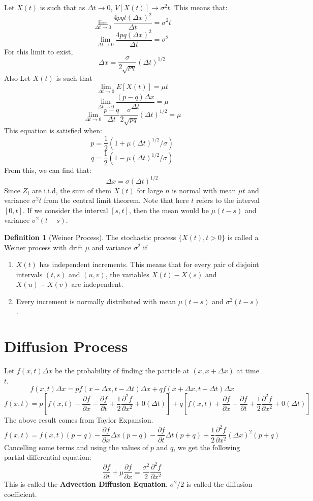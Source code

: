 \documentclass[12pt,letterpaper]{book}
\theoremstyle{definition}
\newtheorem{definition}{Definition}%
\begin{document}
Let $X(t)$ is such that as $\Delta t \rightarrow 0$, $V[X(t)] \rightarrow \sigma^2t$. This means that:
\[\lim_{\Delta t \rightarrow 0} \frac{4pqt (\Delta x)^2}{\Delta t} = \sigma^2 t\]
\[\lim_{\Delta t \rightarrow 0} \frac{4pq (\Delta x)^2}{\Delta t} = \sigma^2\]
For this limit to exist, 
\[\Delta x = \frac{\sigma}{2\sqrt{pq}} (\Delta t)^{1/2}\]
Also Let $X(t)$ is such that 
\[\lim_{\Delta t \rightarrow 0} E[X(t)] = \mu t\]
\[\lim_{\Delta t \rightarrow 0} \frac{(p-q) \Delta x}{\Delta t} = \mu\]
\[\lim_{\Delta t \rightarrow 0} \frac{p-q}{\Delta t} \frac{\sigma}{2\sqrt{pq}} (\Delta t)^{1/2} = \mu\]
This equation is satisfied when:
\[p = \frac{1}{2} (1 + \mu (\Delta t)^{1/2} / \sigma)\]
\[q = \frac{1}{2} (1 - \mu (\Delta t)^{1/2} / \sigma)\]
From this, we can find that:
\[\Delta x = \sigma (\Delta t)^{1/2}\]
Since $Z_i$ are i.i.d, the sum of them $X(t)$ for large $n$ is normal with mean $\mu t$ and variance $\sigma^2 t$ from the central limit theorem. Note that here $t$ refers to the interval $[0,t]$. If we consider the interval $[s,t]$, then the mean would be $\mu(t-s)$ and variance $\sigma^2(t-s)$.

\begin{definition}[Weiner Process]
  The stochastic process $\{X(t), t > 0\}$ is called a Weiner process with drift $\mu$ and variance $\sigma^2$ if
  \begin{enumerate}
    \item $X(t)$ has independent increments. This means that for every pair of disjoint intervals $(t,s)$ and $(u,v)$, the variables $X(t) - X(s)$ and $X(u) - X(v)$ are independent.
    \item Every increment is normally distributed with mean $\mu(t-s)$ and $\sigma^2(t-s)$.
  \end{enumerate}
\end{definition}

\section{Diffusion Process}

Let $f(x,t) \Delta x$ be the probability of finding the particle at $(x, x+ \Delta x)$ at time $t$.
\[f(x,t) \Delta x = p f(x - \Delta x, t - \Delta t) \Delta x + q f(x + \Delta x, t - \Delta t) \Delta x\]
\[f(x,t) = p \left[f(x,t) - \frac{\partial f}{\partial x} - \frac{\partial f}{\partial t} + \frac{1}{2} \frac{\partial ^ 2 f}{\partial x^2} + 0 (\Delta t) \right] + q\left[f(x,t) + \frac{\partial f}{\partial x} - \frac{\partial f}{\partial t} + \frac{1}{2} \frac{\partial ^ 2 f}{\partial x^2} + 0 (\Delta t) \right]  \]
The above result comes from Taylor Expansion.
\[f(x,t) = f(x,t)(p+q) - \frac{\partial f}{\partial x} \Delta x (p-q) - \frac{\partial f}{\partial t} \Delta t (p+q) + \frac{1}{2} \frac{\partial^2 f}{\partial x^2} (\Delta x)^2 (p+q) \]
Cancelling some terms and using the values of $p$ and $q$, we get the following partial differential equation:
\[\frac{\partial f}{\partial t} + \mu \frac{\partial f}{\partial x} = \frac{\sigma^2}{2} \frac{\partial^2 f}{\partial x^2}\]
This is called the \textbf{Advection Diffusion Equation}. $\sigma^2/2$ is called the diffusion coefficient.
\end{document}
